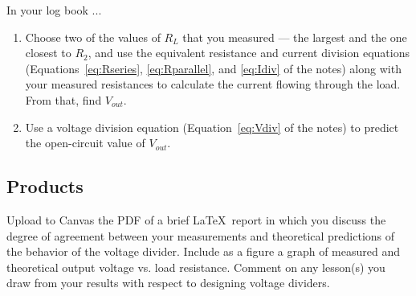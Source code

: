 \documentclass[11pt]{article}
\begin{document}
In your log book ...

\begin{enumerate}
\item Choose two of the values of $R_L$ that you measured --- the
  largest and the one closest to $R_2$, and use the equivalent
  resistance and current division equations
  (Equations~\ref{eq:Rseries}, \ref{eq:Rparallel}, and \ref{eq:Idiv}
  of the notes) along with your measured resistances to calculate the
  current flowing through the load. From that, find $V_{out}$.

\item Use a voltage division equation (Equation~\ref{eq:Vdiv} of the
  notes) to predict the open-circuit value of $V_{out}$.
\end{enumerate}

\subsection*{Products}

Upload to Canvas the PDF of a brief \LaTeX\ report in which you
discuss the degree of agreement between your measurements and
theoretical predictions of the behavior of the voltage
divider. Include as a figure a graph of measured and theoretical
output voltage vs. load resistance. Comment on any lesson(s) you draw
from your results with respect to designing voltage dividers.
\end{document}

